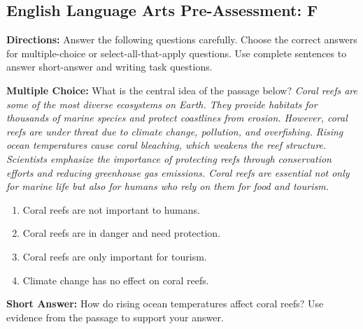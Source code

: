 \documentclass[12pt]{article}
\begin{document}
\subsection*{English Language Arts Pre-Assessment: F}
\onehalfspacing

\begin{tcolorbox}[colframe=black!50, colback=white, title=Assessment Directions]
\textbf{Directions:} Answer the following questions carefully. Choose the correct answers for multiple-choice or select-all-that-apply questions. Use complete sentences to answer short-answer and writing task questions.
\end{tcolorbox}

\begin{tcolorbox}[colframe=black!50, colback=white, title=Question 1]
\textbf{Multiple Choice:} What is the central idea of the passage below?  
\textit{Coral reefs are some of the most diverse ecosystems on Earth. They provide habitats for thousands of marine species and protect coastlines from erosion. However, coral reefs are under threat due to climate change, pollution, and overfishing. Rising ocean temperatures cause coral bleaching, which weakens the reef structure. Scientists emphasize the importance of protecting reefs through conservation efforts and reducing greenhouse gas emissions. Coral reefs are essential not only for marine life but also for humans who rely on them for food and tourism.}  
\begin{enumerate}[label=(\Alph*)]
\item Coral reefs are not important to humans.  
\item Coral reefs are in danger and need protection.  
\item Coral reefs are only important for tourism.  
\item Climate change has no effect on coral reefs.  
\end{enumerate}
\end{tcolorbox}

\begin{tcolorbox}[colframe=black!50, colback=white, title=Question 2]
\textbf{Short Answer:} How do rising ocean temperatures affect coral reefs? Use evidence from the passage to support your answer.  

\vspace{2em}
\\[0.8cm] \underline{\hspace{15.8cm}}  
    \\[0.8cm] \underline{\hspace{15.8cm}}  
\end{tcolorbox}
\end{document}
